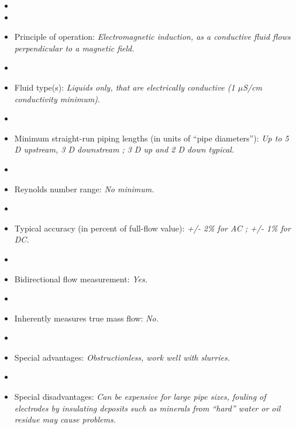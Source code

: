 \begin{itemize}
\goodbreak
\item{} 
\vskip 5pt
\item\item{} Principle of operation: {\it Electromagnetic induction, as a conductive fluid flows perpendicular to a magnetic field.}
\vskip 5pt
\item\item{} Fluid type(s): {\it Liquids only, that are electrically conductive (1 $\mu$S/cm conductivity minimum).}
\vskip 5pt
\item\item{} Minimum straight-run piping lengths (in units of ``pipe diameters''): {\it Up to 5 D upstream, 3 D downstream ; 3 D up and 2 D down typical.}
\vskip 5pt
\item\item{} Reynolds number range: {\it No minimum.}
\vskip 5pt
\item\item{} Typical accuracy (in percent of full-flow value): {\it +/- 2\% for AC ; +/- 1\% for DC.}
\vskip 5pt
\item\item{} Bidirectional flow measurement: {\it Yes.}
\vskip 5pt
\item\item{} Inherently measures true mass flow: {\it No.}
\vskip 5pt
\item\item{} Special advantages: {\it Obstructionless, work well with slurries.}
\vskip 5pt
\item\item{} Special disadvantages: {\it Can be expensive for large pipe sizes, fouling of electrodes by insulating deposits such as minerals from ``hard'' water or oil residue may cause problems.}
\end{itemize}

